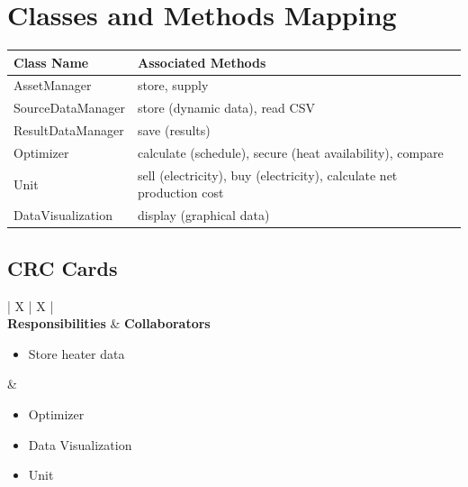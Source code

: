 \vspace{2em}

\section{Classes and Methods Mapping}
\renewcommand{\arraystretch}{1.5} %
\begin{tabularx}{\textwidth}{@{} l X @{}}
    \toprule
    \textbf{Class Name} & \textbf{Associated Methods} \\
    \midrule
    \textcolor{nounred}{AssetManager} & \textcolor{verbblue}{store}, \textcolor{verbblue}{supply} \\
    \textcolor{nounred}{SourceDataManager} & \textcolor{verbblue}{store} (dynamic data), \textcolor{verbblue}{read} CSV \\
    \textcolor{nounred}{ResultDataManager} & \textcolor{verbblue}{save} (results) \\
    \textcolor{nounred}{Optimizer} & \textcolor{verbblue}{calculate} (schedule), \textcolor{verbblue}{secure} (heat availability), \textcolor{verbblue}{compare} \\
    \textcolor{nounred}{Unit} & \textcolor{verbblue}{sell} (electricity), \textcolor{verbblue}{buy} (electricity), \textcolor{verbblue}{calculate} net production cost \\
    \textcolor{nounred}{DataVisualization} & \textcolor{verbblue}{display} (graphical data) \\
    \bottomrule
\end{tabularx}

\subsection*{CRC Cards}
\noindent
\begin{tabularx}{\textwidth}{| X | X |}
    \hline
     \\
    \hline
    \textbf{Responsibilities} & \textbf{Collaborators} \\
    \hline
    \begin{itemize}[leftmargin=*, nosep, before=\vspace{-0.2\baselineskip}]
        \item Store heater data
    \end{itemize} & 
    \begin{itemize}[leftmargin=*, nosep, before=\vspace{-0.2\baselineskip}]
        \item Optimizer
        \item Data Visualization
        \item Unit
    \end{itemize} \\
    \hline
\end{tabularx}

